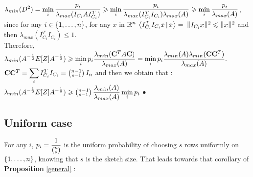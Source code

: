 $\displaystyle \lambda_{min}(D^{2}) =  \min_{i}  \frac{p_{i}}{\lambda_{max}(I_{C_{i}} A I_{C_{i}}^{T} ) } \geqslant  \min_{i}\frac{p_{i} }{\lambda_{max}(I_{C_{i}}^{T} I_{C_{i}}) \lambda_{max}(A)}  \geqslant \min_{i}\frac{ p_{i} }{\lambda_{max}(A)} $, 
since for any $i\in \left\{1,\dots,n\right\}$, for any $x$ in ${\mathbb R}^{n}$ 
$\left<I_{C_{i}}^{T} I_{C_{i}} x \,|\,x\right> =$
$ \norm{ I_{C_{i}}x }^{2} \leq \norm{x}^{2}$
 and then $\lambda_{max}( I_{C_{i}}^{T} I_{C_{i}}  ) \leq 1$.\\
 
 Therefore, 
$\displaystyle \lambda_{min}(A^{-\frac12}E[Z]A^{-\frac12} ) \geqslant  \min_{i} p_{i} \frac{\lambda_{min}(\bold{C}^{T}A \bold{C} )}{\lambda_{max}(A)}  =  \min_{i} p_{i} \frac{ \lambda_{min}(A) \lambda_{min}(\bold{C} \bold{C}^{T} )}{\lambda_{max}(A)}.$\\

$\bold{C} \bold{C}^{T}= \displaystyle\sum\limits_{i} I_{C_{i}}^{T} I_{C_{i}} = \left(\substack{n-1 \\ s-1}\right) I_{n} $ and then we obtain that :\\ 


$\displaystyle \lambda_{min}(A^{-\frac12}E[Z]A^{-\frac12} )  \geqslant  \displaystyle \left(\substack{n-1 \\ s-1}\right)\frac{\lambda_{min}(A)}{\lambda_{max}(A)}\min_{i} p_{i} $ $\bullet$


\subsection{Uniform case}

For any $i$, $p_{i} = \displaystyle\frac{1}{\left(\substack{ n \\ s }\right)}$ is the uniform probability of choosing $s$ rows uniformly on $\left\{1,\dots,n\right\}$, knowing that $s$ is the sketch size. That leads towards that corollary of \textbf{Proposition} \ref{general} :\\


 

